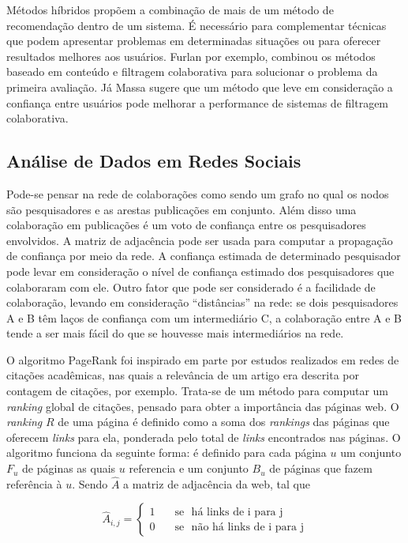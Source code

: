 \documentclass[12pt]{article}
\begin{document}
Métodos híbridos propõem a combinação de mais de um método de recomendação dentro de um sistema. É necessário para complementar técnicas que podem apresentar problemas em determinadas situações ou para oferecer resultados melhores aos usuários. Furlan \cite{da2018desenvolvimento} por exemplo, combinou os métodos baseado em conteúdo e filtragem colaborativa para solucionar o problema da primeira avaliação. Já Massa \cite{massa2004trust} sugere que um método que leve em consideração a confiança entre usuários pode melhorar a performance de sistemas de filtragem colaborativa.

\subsection{Análise de Dados em Redes Sociais}\label{sect:analysis}

Pode-se pensar na rede de colaborações como sendo um grafo no qual os nodos são pesquisadores e as arestas publicações em conjunto. Além disso uma colaboração em publicações é um voto de confiança entre os pesquisadores envolvidos. A matriz de adjacência pode ser usada para computar a propagação de confiança por meio da rede. A confiança estimada de determinado pesquisador pode levar em consideração o nível de confiança estimado dos pesquisadores que colaboraram com ele. Outro fator que pode ser considerado é a facilidade de colaboração, levando em  consideração “distâncias” na rede: se dois pesquisadores A e B têm laços de confiança com um intermediário C, a colaboração entre A e B tende a ser mais fácil do que se houvesse mais intermediários na rede.

O algoritmo PageRank \cite{page1999pagerank} foi inspirado em parte por estudos realizados em redes de citações acadêmicas, nas quais a relevância de um artigo era descrita por contagem de citações, por exemplo. Trata-se de um método para computar um \textit{ranking}  global de citações, pensado para obter a importância das páginas web. O \textit{ranking} $R$ de uma página é definido como a soma dos  \textit{rankings} das páginas que oferecem \textit{links} para ela, ponderada pelo total de \textit{links} encontrados nas páginas. O algoritmo funciona da seguinte forma: é definido para cada página $u$ um conjunto $F_u$ de páginas as quais $u$ referencia e um conjunto $B_u$ de páginas que fazem referência à $u$. Sendo $\hat{A}$ a matriz de adjacência da web, tal que 

\begin{equation} \label{eqn:adjacency-matrix}
   \hat{A}_{i,j} =
    \begin{cases}
      1       & \quad \text{se } \text{ há links de i para j}\\
      0       & \quad \text{se } \text{ não há links de i para j}
    \end{cases}
\end{equation}
\end{document}
